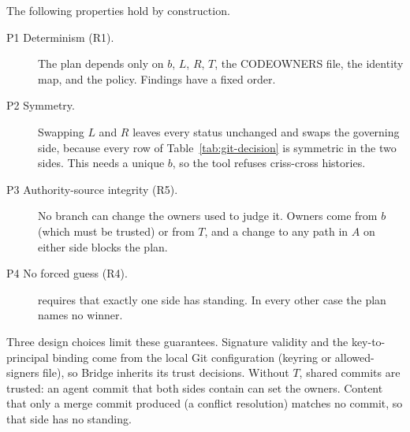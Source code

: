 The following properties hold by construction.
\begin{description}
    \item[P1 Determinism (R1).] The plan depends only on $b$, $L$, $R$, $T$, the CODEOWNERS file, the identity map, and the policy. Findings have a fixed order.
    \item[P2 Symmetry.] Swapping $L$ and $R$ leaves every status unchanged and swaps the governing side, because every row of Table~\ref{tab:git-decision} is symmetric in the two sides. This needs a unique $b$, so the tool refuses criss-cross histories.
    \item[P3 Authority-source integrity (R5).] No branch can change the owners used to judge it. Owners come from $b$ (which must be trusted) or from $T$, and a change to any path in $A$ on either side blocks the plan.
    \item[P4 No forced guess (R4).] \sPWO{} requires that exactly one side has standing. In every other case the plan names no winner.
\end{description}

Three design choices limit these guarantees. Signature validity and the key-to-principal binding come from the local Git configuration (keyring or allowed-signers file), so Bridge inherits its trust decisions. Without $T$, shared commits are trusted: an agent commit that both sides contain can set the owners. Content that only a merge commit produced (a conflict resolution) matches no commit, so that side has no standing.
